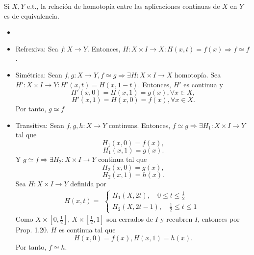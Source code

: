 \begin{prop}
  Si $X, Y$ e.t., la relación de homotopía entre las aplicaciones continuas de $X$ en $Y$ es de equivalencia.
\end{prop}

\begin{dem}
  \begin{itemize}
    \item []
  \item Refrexiva: Sea $f : X \to Y$. Entonces, $H : X \times I \to X : H(x,t) = f(x) \Rightarrow f \simeq f$.
  \item Simétrica: Sean $f,g : X \to Y, f \simeq g \Rightarrow \exists H : X \times I \to X $ homotopía. Sea $H': X \times I \rightarrow Y : H'(x, t) = H(x, 1 - t)$. Entonces, $H'$ es continua y 
    \[ 
      H'(x,0) = H(x, 1) = g(x), \forall x \in X,
    \] 
    \[ 
      H'(x,1) = H(x, 0) = f(x), \forall x \in X.
    \] 
    Por tanto, $g \simeq f$
  \item Transitiva: Sean $f,g,h : X \to Y$ continuas. Entonces, $f \simeq g \Rightarrow \exists H_{1} : X \times I \to Y$ tal que
    \[ 
      H_{1}(x, 0) = f(x),
    \] 
    \[ 
      H_{1}(x, 1) = g(x).
    \] 
    Y $ g \simeq f \Rightarrow \exists H_{2} : X \times I \to Y$ continua tal que
    \[ 
      H_{2}(x, 0) = g(x),
    \] 
    \[ 
      H_{2}(x, 1) = h(x).
    \] 
    Sea $H : X \times I \to Y$ definida por
    \[ 
      H(x,t) =
      \begin{aligned}
        \begin{cases}
          H_{1}(X, 2t), \quad 0 \leq t \leq \frac{1}{2} \\
          H_{2}(X, 2t - 1), \quad \frac{1}{2} \leq t \leq 1
        \end{cases}
      \end{aligned} 
    \] 
    Como $X \times [0, \frac{1}{2}]$, $X \times [\frac{1}{2}, 1]$ son cerrados de $I$ y recubren $I$, entonces por Prop. 1.20. $H$ es continua tal que
    \[ 
      H(x,0) = f(x),
      H(x,1) = h(x).
    \] 
    Por tanto, $f \simeq h$.
  \end{itemize}
\end{dem}
